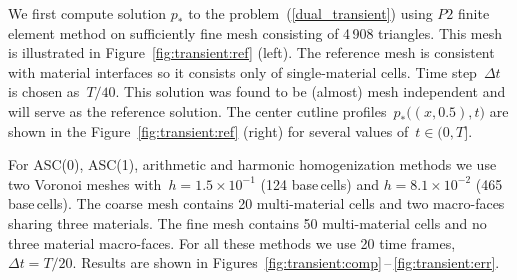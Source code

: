 We first compute solution $p_*$ to the problem~(\ref{dual_transient}) using $P2$ finite element method on sufficiently fine mesh consisting of 4\,908 triangles. This mesh is illustrated in Figure~\ref{fig:transient:ref} (left). The reference mesh is consistent with material interfaces so it consists only of single-material cells. Time step~$\Delta t$ is chosen as~$T / 40$. This solution was found to be (almost) mesh independent and will serve as the  reference solution. The center cutline profiles~$p_*\big((x,0.5), t\big)$   are shown in the Figure~\ref{fig:transient:ref} (right) for several values of~$t \in (0, T]$.
	
For ASC(0), ASC(1), arithmetic and harmonic homogenization methods we use two Voronoi meshes with~$h = 1.5 \times 10^{-1}$ (124 base\,cells) and $h = 8.1 \times 10^{-2}$ (465 base\,cells).
The coarse mesh contains 20 multi-material cells and two macro-faces sharing three materials. The fine mesh contains 50 multi-material cells and no three material macro-faces. For all these methods we use 20 time frames, $\Delta t = T / 20$. Results are shown in Figures~\ref{fig:transient:comp}\,--\,\ref{fig:transient:err}.

\clearpage

